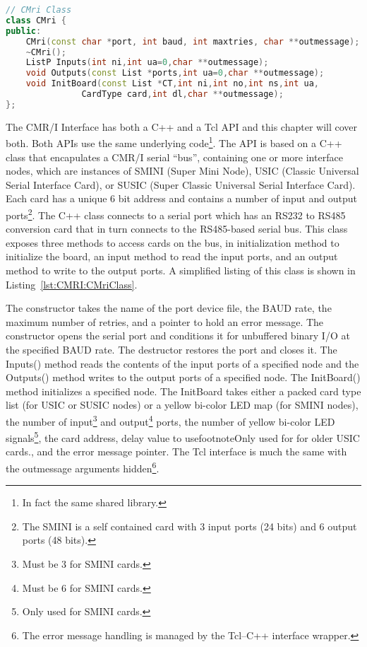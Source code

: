 \begin{lstlisting}[caption={CMri Class},
		   language=C++,label=lst:CMRI:CMriClass]
// CMri Class
class CMri {
public:
	CMri(const char *port, int baud, int maxtries, char **outmessage);
	~CMri();
	ListP Inputs(int ni,int ua=0,char **outmessage);
	void Outputs(const List *ports,int ua=0,char **outmessage);
	void InitBoard(const List *CT,int ni,int no,int ns,int ua,
		       CardType card,int dl,char **outmessage);
};
\end{lstlisting}
The CMR/I Interface has both a C++ and a Tcl API and this chapter will
cover both. Both APIs use the same underlying  code\footnote{In fact
the same shared library.}. The API is based on a C++ class that
encapulates a CMR/I serial ``bus'', containing one or more interface
nodes, which are instances of SMINI (Super Mini Node), USIC (Classic
Universal Serial Interface Card), or SUSIC (Super Classic Universal
Serial Interface Card). Each card has a unique 6 bit address and
contains a number of input and output ports\footnote{The SMINI is a
self contained card with 3 input ports (24 bits) and 6 output ports (48
bits).}. The C++ class connects to a serial port which has an RS232 to
RS485 conversion card that in turn connects to the RS485-based serial
bus. This class exposes three methods to access cards on the bus, in
initialization method to initialize the board, an input method to read
the input ports, and an output method to write to the output ports. A
simplified listing of this class is shown in
Listing~\ref{lst:CMRI:CMriClass}. 

The constructor takes the name of the port device file, the BAUD rate,
the maximum number of retries, and a pointer to hold an error message.
The constructor opens the serial port and conditions it for unbuffered
binary I/O at the specified BAUD rate. The destructor restores the port
and closes it. The Inputs() method reads the contents of the input
ports of a specified node and the Outputs() method writes to the output
ports of a specified node. The InitBoard() method initializes a
specified node. The InitBoard takes either a packed card type list (for
USIC or SUSIC nodes) or a yellow bi-color LED map (for SMINI nodes),
the number of input\footnote{Must be 3 for SMINI cards.} and
output\footnote{Must be 6 for SMINI cards.} ports, the number of yellow
bi-color LED signals\footnote{Only used for SMINI cards.}, the card
address, delay value to usefootnote{Only used for for older USIC
cards.}, and the error message pointer.  The Tcl interface is much the
same with the outmessage arguments hidden\footnote{The error message
handling is managed by the Tcl--C++ interface wrapper.}.

